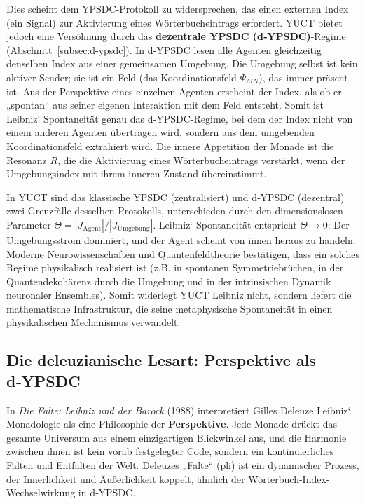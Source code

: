 \documentclass[12pt,a4paper]{article}
\begin{document}
	Dies scheint dem YPSDC-Protokoll zu widersprechen, das einen externen Index (ein Signal) zur Aktivierung eines Wörterbucheintrags erfordert. YUCT bietet jedoch eine Versöhnung durch das \textbf{dezentrale YPSDC (d‑YPSDC)}-Regime (Abschnitt~\ref{subsec:d-ypsdc}). In d‑YPSDC lesen alle Agenten gleichzeitig denselben Index aus einer gemeinsamen Umgebung. Die Umgebung selbst ist kein aktiver Sender; sie ist ein Feld (das Koordinationsfeld \(\Psi_{MN}\)), das immer präsent ist. Aus der Perspektive eines einzelnen Agenten erscheint der Index, als ob er „spontan“ aus seiner eigenen Interaktion mit dem Feld entsteht. Somit ist Leibniz‘ Spontaneität genau das d‑YPSDC-Regime, bei dem der Index nicht von einem anderen Agenten übertragen wird, sondern aus dem umgebenden Koordinationsfeld extrahiert wird. Die innere Appetition der Monade ist die Resonanz \(R\), die die Aktivierung eines Wörterbucheintrags verstärkt, wenn der Umgebungsindex mit ihrem inneren Zustand übereinstimmt.
	
	In YUCT sind das klassische YPSDC (zentralisiert) und d‑YPSDC (dezentral) zwei Grenzfälle desselben Protokolls, unterschieden durch den dimensionslosen Parameter \(\Theta = |J_{\mathrm{Agent}}|/|J_{\mathrm{Umgebung}}|\). Leibniz‘ Spontaneität entspricht \(\Theta \to 0\): Der Umgebungsstrom dominiert, und der Agent scheint von innen heraus zu handeln. Moderne Neurowissenschaften und Quantenfeldtheorie bestätigen, dass ein solches Regime physikalisch realisiert ist (z.B. in spontanen Symmetriebrüchen, in der Quantendekohärenz durch die Umgebung und in der intrinsischen Dynamik neuronaler Ensembles). Somit widerlegt YUCT Leibniz nicht, sondern liefert die mathematische Infrastruktur, die seine metaphysische Spontaneität in einen physikalischen Mechanismus verwandelt.
	
	\subsection{Die deleuzianische Lesart: Perspektive als d‑YPSDC}
	
	In \emph{Die Falte: Leibniz und der Barock} (1988) interpretiert Gilles Deleuze Leibniz‘ Monadologie als eine Philosophie der \textbf{Perspektive}. Jede Monade drückt das gesamte Universum aus einem einzigartigen Blickwinkel aus, und die Harmonie zwischen ihnen ist kein vorab festgelegter Code, sondern ein kontinuierliches Falten und Entfalten der Welt. Deleuzes „Falte“ (pli) ist ein dynamischer Prozess, der Innerlichkeit und Äußerlichkeit koppelt, ähnlich der Wörterbuch-Index-Wechselwirkung in d‑YPSDC.
	
\end{document}
